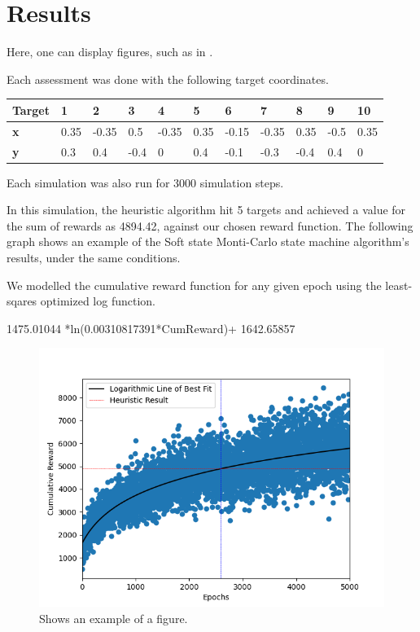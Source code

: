 \section{Results}

Here, one can display figures, such as in .

Each assessment was done with the following target coordinates.

\begin{table}[]
    \begin{tabular}{|l|l|l|l|l|l|l|l|l|l|l|}
    \hline
    \textbf{Target} & \textbf{1} & \textbf{2} & \textbf{3} & \textbf{4} & \textbf{5} & \textbf{6} & \textbf{7} & \textbf{8} & \textbf{9} & \textbf{10} \\ \hline
    \textbf{x}      & 0.35       & -0.35      & 0.5        & -0.35      & 0.35       & -0.15      & -0.35      & 0.35       & -0.5       & 0.35        \\ \hline
    \textbf{y}      & 0.3        & 0.4        & -0.4       & 0          & 0.4        & -0.1       & -0.3       & -0.4       & 0.4        & 0           \\ \hline
    \end{tabular}
\end{table}

Each simulation was also run for 3000 simulation steps.

In this simulation, the heuristic algorithm hit 5 targets and achieved a value for the sum of rewards as 4894.42, against our chosen reward function.
The following graph shows an example of the Soft state Monti-Carlo state machine algorithm’s results, under the same conditions.

We modelled the cumulative reward function for any given epoch using the least-sqares optimized log function.

1475.01044  *ln(0.00310817391*CumReward)+ 1642.65857 




\begin{figure}
    \centering
    \includegraphics[width=\singlefigure]{figures/figure_2.png}
    \caption{\label{fig:example} Shows an example of a figure.}
\end{figure}

